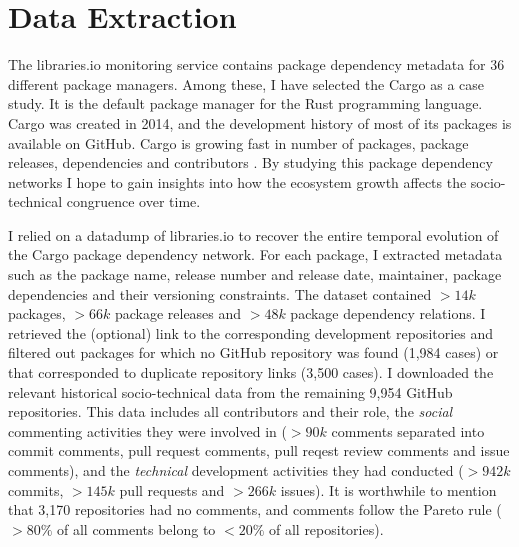 \section{Data Extraction}

The \textsf{libraries.io} monitoring service contains package dependency metadata for 36 different package managers.
Among these, I have selected the Cargo as a case study. It is the default package manager for %
the Rust programming language. Cargo was created in 2014, and the development history of most of its packages is available on GitHub. 
Cargo is growing fast in number of packages, package releases, dependencies and contributors \cite{Decan2019EMSE}. 
By studying this package dependency networks I hope to gain insights into how the ecosystem growth affects the socio-technical congruence over time.

I relied on a datadump of libraries.io \cite{Katz2018} to recover the entire temporal evolution of the Cargo package dependency network. 
For each package, I extracted metadata such as the package name, release number and release date, maintainer, package dependencies and their versioning constraints. 
The dataset contained $>14k$ packages, $>66k$ package releases and $>48k$ package dependency relations.
I retrieved the (optional) link to the corresponding development repositories and filtered out packages for which no GitHub repository was found (1,984 cases) %
or that corresponded to duplicate repository links (3,500 cases).
I downloaded the relevant historical socio-technical data from the remaining 9,954 GitHub repositories.
This data includes all contributors and their role, the \emph{social} commenting activities they were involved in ($>90k$ comments separated into commit comments, pull request comments, pull reqest review comments and issue comments), and the \emph{technical} development activities they had conducted ($>942k$ commits, $>145k$ pull requests and $>266k$ issues).
It is worthwhile to mention that 3,170 repositories had no comments, and comments follow the Pareto rule ($>80\%$ of all comments belong to $<20\%$ of all repositories).